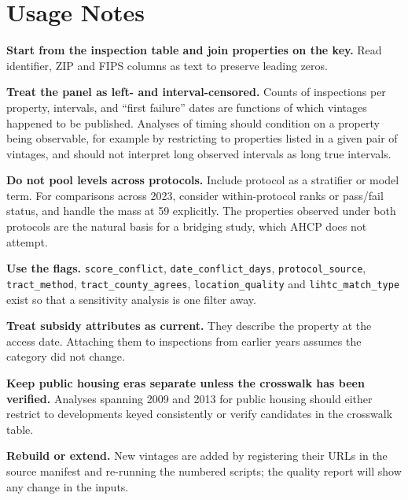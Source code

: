 \documentclass[10pt,twocolumn,letterpaper]{article}
\newcommand{\runhead}[1]{\par\vspace{0.35ex}\noindent\textbf{#1}\hspace{0.35em}}
\newcommand{\col}[1]{\texttt{\small #1}}
\begin{document}
\section{Usage Notes}\label{sec:usage}
\runhead{Start from the inspection table and join properties on the key.} Read identifier, ZIP and FIPS columns as text to preserve leading zeros.

\runhead{Treat the panel as left- and interval-censored.} Counts of inspections per property, intervals, and ``first failure'' dates are functions of which vintages happened to be published. Analyses of timing should condition on a property being observable, for example by restricting to properties listed in a given pair of vintages, and should not interpret long observed intervals as long true intervals.

\runhead{Do not pool levels across protocols.} Include protocol as a stratifier or model term. For comparisons across 2023, consider within-protocol ranks or pass/fail status, and handle the mass at 59 explicitly. The \SPropertiesBothProtocols{} properties observed under both protocols are the natural basis for a bridging study, which AHCP does not attempt.

\runhead{Use the flags.} \col{score\_conflict}, \col{date\_conflict\_days}, \col{protocol\_source}, \col{tract\_method}, \col{tract\_county\_agrees}, \col{location\_quality} and \col{lihtc\_match\_type} exist so that a sensitivity analysis is one filter away.

\runhead{Treat subsidy attributes as current.} They describe the property at the access date. Attaching them to inspections from earlier years assumes the category did not change.

\runhead{Keep public housing eras separate unless the crosswalk has been verified.} Analyses spanning 2009 and 2013 for public housing should either restrict to developments keyed consistently or verify candidates in the crosswalk table.

\runhead{Rebuild or extend.} New vintages are added by registering their URLs in the source manifest and re-running the numbered scripts; the quality report will show any change in the inputs.
\end{document}
